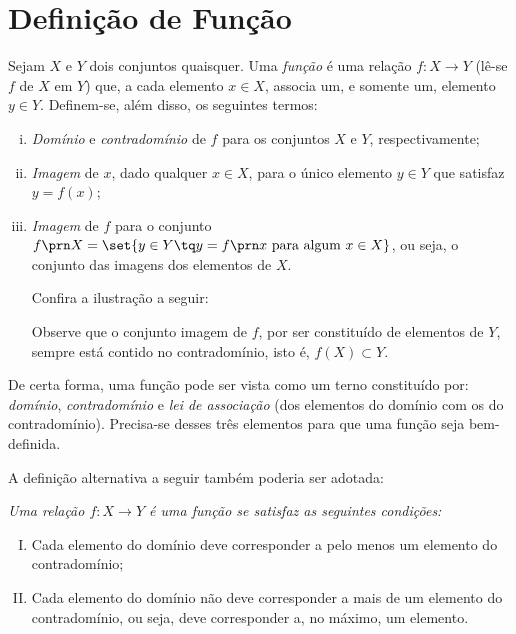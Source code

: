 \section{Definição de Função}

\begin{definition}
Sejam $X$ e $Y$ dois conjuntos quaisquer.
Uma \emph{função} é uma relação $f: X \to Y$ (lê-se $f$ de $X$ em $Y$) que, a cada elemento $x \in X$, associa um, e somente um, elemento $y \in Y$.
Definem-se, além disso, os seguintes termos:
%
\begin{enumerate}[(i)]
\item \emph{Domínio} e \emph{contradomínio} de $f$ para os conjuntos $X$ e $Y$, respectivamente;
\item \emph{Imagem} de $x$, dado qualquer $x \in X$, para o único elemento $y \in Y$ que satisfaz $y = f(x)$;
\item \emph{Imagem} de $f$ para o conjunto $f\prn X = \set{y \in Y \tq y = f \prn x \text{ para algum } x \in X }$, ou seja, o conjunto das imagens dos elementos de $X$.

Confira a ilustração a seguir:
\begin{center}
\end{center}
Observe que o conjunto imagem de $f$, por ser constituído de elementos de $Y$, sempre está contido no contradomínio, isto é, $f(X) \subset Y$.
\end{enumerate}
\end{definition}

De certa forma, uma função pode ser vista como um terno constituído por: \emph{domínio}, \emph{contradomínio} e \emph{lei de associação} (dos elementos do domínio com os do contradomínio). 
Precisa-se desses três elementos para que uma função seja bem-definida. 

A definição alternativa a seguir também poderia ser adotada:
{\it \label{def:funcao-alternativa} Uma relação $f: X \to Y$ é uma \emph {função} se satisfaz as seguintes condições:
%
\begin{enumerate}[(I)]
  \item Cada elemento do domínio deve corresponder a pelo menos um elemento do contradomínio;
  \item Cada elemento do domínio não deve corresponder a mais de um elemento do contradomínio, ou seja, deve corresponder a, no máximo, um elemento.
\end{enumerate}}


